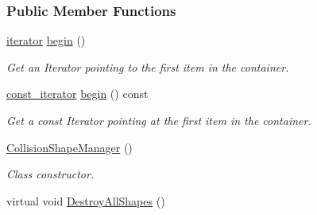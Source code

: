 \subsubsection*{Public Member Functions}
\begin{DoxyCompactItemize}
\item 
\hyperlink{classMezzanine_1_1CollisionShapeManager_abec03ca004aae3ce0dc478e34e5d1252}{iterator} \hyperlink{classMezzanine_1_1CollisionShapeManager_a8b73066314e6fe91cce3507f5d85584f}{begin} ()
\begin{DoxyCompactList}\small\item\em Get an Iterator pointing to the first item in the container. \item\end{DoxyCompactList}\item 
\hyperlink{classMezzanine_1_1CollisionShapeManager_a44318f2b04d35ecc76d5c58ea574f0f0}{const\_\-iterator} \hyperlink{classMezzanine_1_1CollisionShapeManager_ad588bcca5ef47d467439171edf5640a0}{begin} () const 
\begin{DoxyCompactList}\small\item\em Get a const Iterator pointing at the first item in the container. \item\end{DoxyCompactList}\item 
\hypertarget{classMezzanine_1_1CollisionShapeManager_a47c3e4e886e22abb3c8017e8f244cac2}{
\hyperlink{classMezzanine_1_1CollisionShapeManager_a47c3e4e886e22abb3c8017e8f244cac2}{CollisionShapeManager} ()}
\label{classMezzanine_1_1CollisionShapeManager_a47c3e4e886e22abb3c8017e8f244cac2}

\begin{DoxyCompactList}\small\item\em Class constructor. \item\end{DoxyCompactList}\item 
\hypertarget{classMezzanine_1_1CollisionShapeManager_aa7d9c7a9fe78def866e1abc02b261b53}{
virtual void \hyperlink{classMezzanine_1_1CollisionShapeManager_aa7d9c7a9fe78def866e1abc02b261b53}{DestroyAllShapes} ()}
\label{classMezzanine_1_1CollisionShapeManager_aa7d9c7a9fe78def866e1abc02b261b53}


\end{DoxyCompactItemize}
